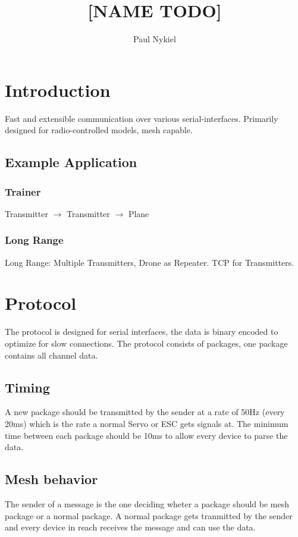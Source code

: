 \documentclass{report}
\title{[NAME TODO]}
\author{Paul Nykiel}
\begin{document}
\maketitle
\tableofcontents

\pagebreak

\chapter{Introduction}
  Fast and extensible communication over various serial-interfaces. Primarily
  designed for radio-controlled models, mesh capable.

\section{Example Application}
\subsection{Trainer}
Transmitter $\to$ Transmitter $\to$ Plane
\subsection{Long Range}
  Long Range: Multiple Transmitters, Drone as Repeater. TCP for Transmitters.

\chapter{Protocol}
  The protocol is designed for serial interfaces, the data is binary encoded to
  optimize for slow connections. The protocol consists of packages, one package
  contains all channel data.

  \section{Timing}
    A new package should be transmitted by the sender at a rate of 50Hz (every
    20ms) which is the rate a normal Servo or ESC gets signals at. The minimum
    time between each package should be 10ms to allow every device to parse the
    data.

  \section{Mesh behavior}
    The sender of a message is the one deciding wheter a package should be mesh
    package or a normal package. A normal package gets tranmitted by the sender
    and every device in reach receives the message and can use the data.
\end{document}
